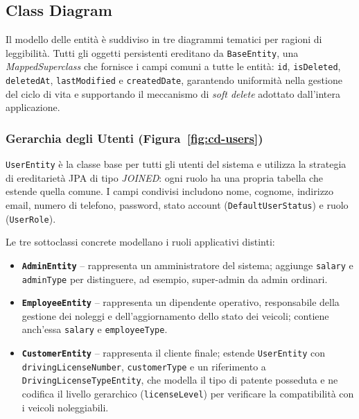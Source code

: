 \documentclass[12pt, a4paper]{article}
\begin{document}
    \subsection{Class Diagram}

    Il modello delle entità è suddiviso in tre diagrammi tematici per ragioni di
    leggibilità. Tutti gli oggetti persistenti ereditano da \texttt{BaseEntity},
    una \textit{MappedSuperclass} che fornisce i campi comuni a tutte le entità:
    \texttt{id}, \texttt{isDeleted}, \texttt{deletedAt}, \texttt{lastModified} e
    \texttt{createdDate}, garantendo uniformità nella gestione del ciclo di vita e
    supportando il meccanismo di \emph{soft delete} adottato dall'intera applicazione.

    \subsubsection*{Gerarchia degli Utenti (Figura~\ref{fig:cd-users})}

    \texttt{UserEntity} è la classe base per tutti gli utenti del sistema e utilizza
    la strategia di ereditarietà JPA di tipo \textit{JOINED}: ogni ruolo ha una propria
    tabella che estende quella comune. I campi condivisi includono nome, cognome,
    indirizzo email, numero di telefono, password, stato account (\texttt{DefaultUserStatus})
    e ruolo (\texttt{UserRole}).

    Le tre sottoclassi concrete modellano i ruoli applicativi distinti:
    \begin{itemize}
        \item \textbf{\texttt{AdminEntity}} -- rappresenta un amministratore del
        sistema; aggiunge \texttt{salary} e \texttt{adminType} per
        distinguere, ad esempio, super-admin da admin ordinari.
        \item \textbf{\texttt{EmployeeEntity}} -- rappresenta un dipendente
        operativo, responsabile della gestione dei noleggi e
        dell'aggiornamento dello stato dei veicoli; contiene anch'essa
        \texttt{salary} e \texttt{employeeType}.
        \item \textbf{\texttt{CustomerEntity}} -- rappresenta il cliente finale;
        estende \texttt{UserEntity} con \texttt{drivingLicenseNumber},
        \texttt{customerType} e un riferimento a
        \texttt{DrivingLicenseTypeEntity}, che modella il tipo di patente
        posseduta e ne codifica il livello gerarchico (\texttt{licenseLevel})
        per verificare la compatibilità con i veicoli noleggiabili.
    \end{itemize}
\end{document}
